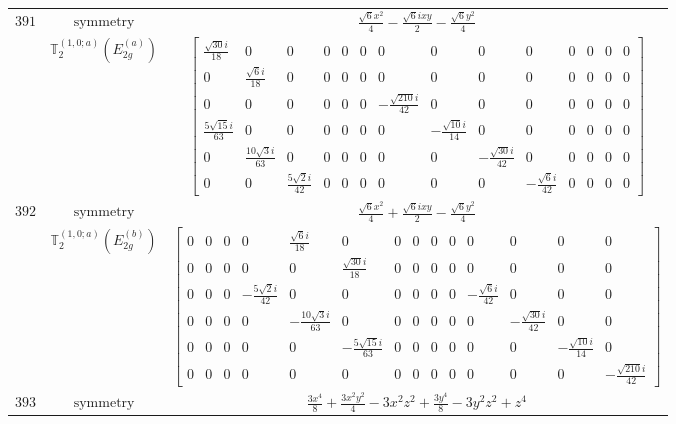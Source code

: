 \documentclass[fleqn,8pt,landscape]{jsarticle}
\begin{document}
\begin{longtable}{ccc}
$ 391 $ & $ \text{symmetry} $ & $ \frac{\sqrt{6} x^{2}}{4} - \frac{\sqrt{6} i x y}{2} - \frac{\sqrt{6} y^{2}}{4} $ \\
$  $ & $ \mathbb{T}_{2}^{(1,0;a)}(E_{2g}^{(a)}) $ & $ \begin{bmatrix} \frac{\sqrt{30} i}{18} & 0 & 0 & 0 & 0 & 0 & 0 & 0 & 0 & 0 & 0 & 0 & 0 & 0 \\ 0 & \frac{\sqrt{6} i}{18} & 0 & 0 & 0 & 0 & 0 & 0 & 0 & 0 & 0 & 0 & 0 & 0 \\ 0 & 0 & 0 & 0 & 0 & 0 & - \frac{\sqrt{210} i}{42} & 0 & 0 & 0 & 0 & 0 & 0 & 0 \\ \frac{5 \sqrt{15} i}{63} & 0 & 0 & 0 & 0 & 0 & 0 & - \frac{\sqrt{10} i}{14} & 0 & 0 & 0 & 0 & 0 & 0 \\ 0 & \frac{10 \sqrt{3} i}{63} & 0 & 0 & 0 & 0 & 0 & 0 & - \frac{\sqrt{30} i}{42} & 0 & 0 & 0 & 0 & 0 \\ 0 & 0 & \frac{5 \sqrt{2} i}{42} & 0 & 0 & 0 & 0 & 0 & 0 & - \frac{\sqrt{6} i}{42} & 0 & 0 & 0 & 0 \end{bmatrix} $ \\ \hline
$ 392 $ & $ \text{symmetry} $ & $ \frac{\sqrt{6} x^{2}}{4} + \frac{\sqrt{6} i x y}{2} - \frac{\sqrt{6} y^{2}}{4} $ \\
$  $ & $ \mathbb{T}_{2}^{(1,0;a)}(E_{2g}^{(b)}) $ & $ \begin{bmatrix} 0 & 0 & 0 & 0 & \frac{\sqrt{6} i}{18} & 0 & 0 & 0 & 0 & 0 & 0 & 0 & 0 & 0 \\ 0 & 0 & 0 & 0 & 0 & \frac{\sqrt{30} i}{18} & 0 & 0 & 0 & 0 & 0 & 0 & 0 & 0 \\ 0 & 0 & 0 & - \frac{5 \sqrt{2} i}{42} & 0 & 0 & 0 & 0 & 0 & 0 & - \frac{\sqrt{6} i}{42} & 0 & 0 & 0 \\ 0 & 0 & 0 & 0 & - \frac{10 \sqrt{3} i}{63} & 0 & 0 & 0 & 0 & 0 & 0 & - \frac{\sqrt{30} i}{42} & 0 & 0 \\ 0 & 0 & 0 & 0 & 0 & - \frac{5 \sqrt{15} i}{63} & 0 & 0 & 0 & 0 & 0 & 0 & - \frac{\sqrt{10} i}{14} & 0 \\ 0 & 0 & 0 & 0 & 0 & 0 & 0 & 0 & 0 & 0 & 0 & 0 & 0 & - \frac{\sqrt{210} i}{42} \end{bmatrix} $ \\ \hline
$ 393 $ & $ \text{symmetry} $ & $ \frac{3 x^{4}}{8} + \frac{3 x^{2} y^{2}}{4} - 3 x^{2} z^{2} + \frac{3 y^{4}}{8} - 3 y^{2} z^{2} + z^{4} $ \\

\end{longtable}
\end{document}
